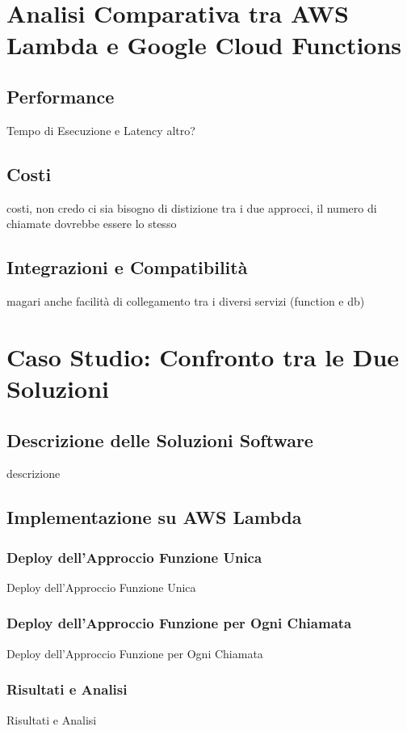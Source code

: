 \documentclass[12pt,a4paper,twoside]{book}
\begin{document}
\chapter{Analisi Comparativa tra AWS Lambda e Google Cloud Functions}
\section{Performance}
Tempo di Esecuzione e Latency
altro?

\section{Costi}
costi, non credo ci sia bisogno di distizione tra i due approcci, il numero di chiamate dovrebbe essere lo stesso

\section{Integrazioni e Compatibilità}
magari anche facilità di collegamento tra i diversi servizi (function e db)

\chapter{Caso Studio: Confronto tra le Due Soluzioni}
\section{Descrizione delle Soluzioni Software}
descrizione

\section{Implementazione su AWS Lambda}
\subsection{Deploy dell’Approccio Funzione Unica}
Deploy dell’Approccio Funzione Unica

\subsection{Deploy dell’Approccio Funzione per Ogni Chiamata}
Deploy dell’Approccio Funzione per Ogni Chiamata

\subsection{Risultati e Analisi}
Risultati e Analisi
\end{document}
